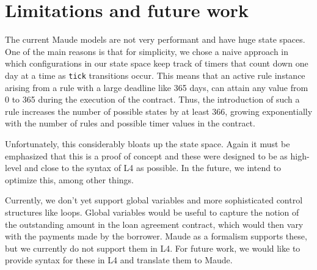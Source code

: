 \documentclass{article}
\begin{document}


\section{Limitations and future work}
The current Maude models are not very performant and have huge state spaces.
One of the main reasons is that for simplicity, we chose a naive approach in
which configurations in our state space keep track of timers that count down
one day at a time as \texttt{tick} transitions occur.
This means that an active rule instance arising from a rule with a large deadline
like 365 days, can attain any value from 0 to 365 during the execution of the
contract.
Thus, the introduction of such a rule increases the number of possible states
by at least 366, growing exponentially with the number of rules and possible
timer values in the contract.


Unfortunately, this considerably bloats up the state space.
Again it must be emphasized that this is a proof of concept and these were
designed to be as high-level and close to the syntax of L4 as possible.
In the future, we intend to optimize this, among other things.


Currently, we don't yet support global variables and more sophisticated control
structures like loops.
Global variables would be useful to capture the notion of the outstanding amount
in the loan agreement contract, which would then vary with the payments made by
the borrower.
Maude as a formalism supports these, but we currently do not support them in L4.
For future work, we would like to provide syntax for these in L4 and translate
them to Maude.
\end{document}
